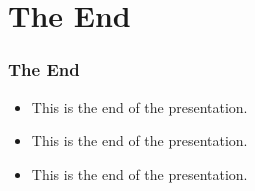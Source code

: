 \documentclass[aspectratio=169, xcolor=table, notheorems, hyperref={pdfpagelabels=false}]{beamer}
\begin{document}
\section{The End}
\begin{frame}
\frametitle{The End}
\begin{itemize}
\item[$\square$] This is the end of the presentation.
\item[$\boxtimes$] This is the end of the presentation.
\item This is the end of the presentation.
\end{itemize}
\end{frame}

\end{document}
